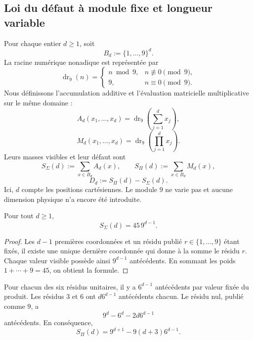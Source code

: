 \subsection{Loi du défaut à module fixe et longueur variable}

Pour chaque entier \(d\geq1\), soit
\[
 B_d:=\{1,\ldots,9\}^d.
\]
La racine numérique nonadique est représentée par
\[
 \operatorname{dr}_9(n)=
 \begin{cases}
 n\bmod9,&n\not\equiv0\pmod9,\\
 9,&n\equiv0\pmod9.
 \end{cases}
\]
Nous définissons l’accumulation additive et l’évaluation matricielle multiplicative
sur le même domaine :
\[
 A_d(x_1,\ldots,x_d)
 =\operatorname{dr}_9\!\left(\sum_{j=1}^d x_j\right),
\]
\[
 M_d(x_1,\ldots,x_d)
 =\operatorname{dr}_9\!\left(\prod_{j=1}^d x_j\right).
\]
Leurs masses visibles et leur défaut sont
\[
 S_\Sigma(d):=\sum_{x\in B_d}A_d(x),
 \qquad
 S_\Pi(d):=\sum_{x\in B_d}M_d(x),
\]
\[
 D_d:=S_\Pi(d)-S_\Sigma(d).
\]
Ici, \(d\) compte les positions cartésiennes. Le module \(9\) ne varie pas et
aucune dimension physique n’a encore été introduite.

\begin{lemma}
\label{p12-83-c1-s5:lem:masa-hoja-aditiva-longitud}
Pour tout \(d\geq1\),
\[
 S_\Sigma(d)=45\,9^{d-1}.
\]
\end{lemma}

\begin{proof}
Les \(d-1\) premières coordonnées et un résidu publié
\(r\in\{1,\ldots,9\}\) étant fixés, il existe une unique dernière coordonnée qui donne à la
somme le résidu \(r\). Chaque valeur visible possède ainsi \(9^{d-1}\)
antécédents. En sommant les poids \(1+\cdots+9=45\), on obtient la formule.
\end{proof}

\begin{lemma}
\label{p12-83-c1-s5:lem:censo-hoja-multiplicativa-longitud}
Pour chacun des six résidus unitaires, il y a \(6^{d-1}\) antécédents
par valeur fixée du produit. Les résidus \(3\) et \(6\) ont
\(d6^{d-1}\) antécédents chacun. Le résidu nul, publié comme \(9\),
a
\[
 9^d-6^d-2d6^{d-1}
\]
antécédents. En conséquence,
\[
 S_\Pi(d)=9^{d+1}-9(d+3)6^{d-1}.
\]
\end{lemma}


